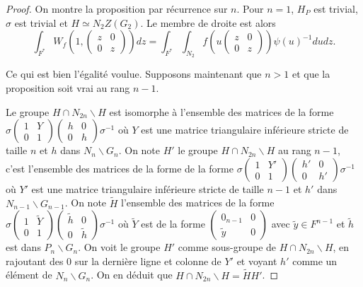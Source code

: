 \documentclass{amsart}
\begin{document}
\begin{proof}
On montre la proposition par récurrence sur $n$. Pour $n=1$, $H_P$ est trivial, $\sigma$ est trivial et $H \simeq N_2 Z(G_2)$. Le membre de droite est alors
\begin{equation}
\int_{F^*} W_f \left(1, \begin{pmatrix}
z & 0 \\
0 & z
\end{pmatrix} \right) dz = \int_{F^*} \int_{N_2} f \left(u\begin{pmatrix}
z & 0 \\
0 & z
\end{pmatrix} \right) \psi(u)^{-1} du dz.
\end{equation}

Ce qui est bien l'égalité voulue. Supposons maintenant que $n > 1$ et que la proposition soit vrai au rang $n-1$.

Le groupe $H \cap N_{2n} \backslash{H}$ est isomorphe à l'ensemble des matrices
de la forme $\sigma \begin{pmatrix}
1 & Y \\
0 & 1
\end{pmatrix}\begin{pmatrix}
h & 0 \\
0 & h
\end{pmatrix} \sigma^{-1}$ où $Y$ est une matrice triangulaire inférieure stricte de taille $n$ et $h$ dans $N_n\backslash{G_n}$. On note $H'$ le groupe $H \cap N_{2n} \backslash{H}$ au rang $n-1$, c'est l'ensemble des matrices de la forme
de la forme $\sigma \begin{pmatrix}
1 & Y' \\
0 & 1
\end{pmatrix}\begin{pmatrix}
h' & 0 \\
0 & h'
\end{pmatrix} \sigma^{-1}$ où $Y'$ est une matrice triangulaire inférieure stricte de taille $n-1$ et $h'$ dans $N_{n-1}\backslash{G_{n-1}}$.
On note $\tilde{H}$ l'ensemble des matrices de la
forme $\sigma \begin{pmatrix}
1 & \tilde{Y} \\
0 & 1
\end{pmatrix}\begin{pmatrix}
\tilde{h} & 0 \\
0 & \tilde{h}
\end{pmatrix} \sigma^{-1}$
où $\tilde{Y}$ est de la forme $\begin{pmatrix}
0_{n-1} & 0 \\
\tilde{y} & 0
\end{pmatrix}$ avec $\tilde{y} \in F^{n-1}$ et $\tilde{h}$ est dans $P_n \backslash{G_n}$. On voit le groupe $H'$ comme sous-groupe de $H \cap N_{2n} \backslash{H}$, en rajoutant des 0 sur la dernière ligne et colonne de $Y'$ et voyant $h'$ comme un élément de $N_n\backslash{G_n}$. On en déduit que $H \cap N_{2n} \backslash{H} = \tilde{H} H'$. 


\end{proof}
\end{document}
